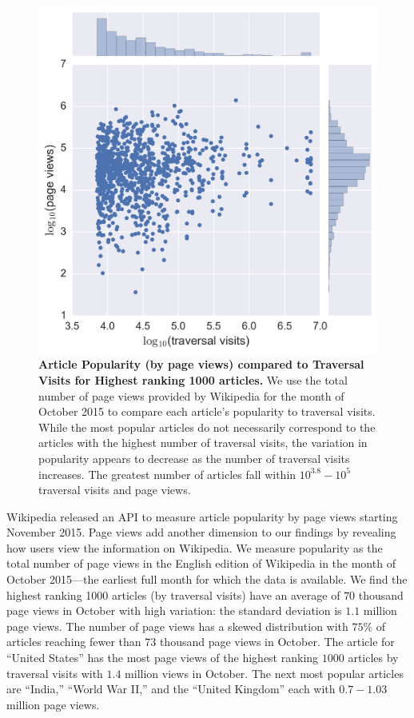 \documentclass[pre,twocolumn,twoside,superscriptaddress,floatfix, aps, 10pt]{revtex4-1}
\begin{document}
\begin{figure}[tp!]
  \includegraphics[width=\columnwidth]{graphics/views_visits.png}
  \caption{
\textbf{Article Popularity (by page views) compared to Traversal Visits 
for Highest ranking 1000 articles.}
We use the total number of page views provided by Wikipedia for the month
of October 2015 to compare each article's popularity to traversal visits.
While the most popular articles do not necessarily correspond to the articles
with the highest number of traversal visits, the variation in popularity appears to decrease as the number of traversal visits increases. The greatest number of articles fall within $10^{3.8}-10^5$ traversal visits and page views.}
  \label{fig:Views and Visits}

\end{figure}
Wikipedia released an API to measure article popularity by page views
starting November 2015. Page views add another dimension to our
findings by revealing 
how users view the information on Wikipedia. 
We measure popularity as the total number 
of page views in the English edition of Wikipedia in the month of 
October 2015---the earliest full month for which the data is available. 
We find the highest ranking 1000 articles (by traversal visits) have an average of
$70$ thousand page views in October with high variation: the standard deviation 
is $1.1$ million page views. 
The number of page views has a skewed distribution with $75\%$ of articles
reaching fewer than $73$ thousand page views in October.
The article for ``United States'' has the most page 
views of the highest ranking $1000$ articles by traversal visits with 
$1.4$ million views in October. The next most popular articles are 
``India,'' ``World War II,'' and the ``United Kingdom'' each with $0.7-1.03$ million page views. 
\end{document}
